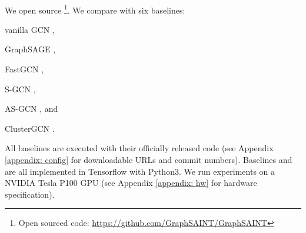\begin{table}[!ht]
\caption{Dataset statistics (``m'' stands for \textbf{m}ulti-class classification, and ``s'' for \textbf{s}ingle-class.)}
    \centering
    \\
    \label{tab: exp-dataset}
\end{table}

We open source {\graphsaint}\footnote{Open sourced code: \url{https://github.com/GraphSAINT/GraphSAINT}}.
We compare with six baselines: 
\begin{enumerate*}
\item vanilla GCN \citep{gcn},
\item GraphSAGE \citep{graphsage},
\item FastGCN \citep{fastgcn},
\item S-GCN \citep{s-gcn},
\item AS-GCN \citep{as-gcn}, and
\item ClusterGCN \citep{cluster-gcn}.
\end{enumerate*}
All baselines are executed with their officially released code (see Appendix \ref{appendix: config} for downloadable URLs and commit numbers).
Baselines and {\graphsaint} are all implemented in Tensorflow with Python3. 
We run experiments on a NVIDIA Tesla P100 GPU (see Appendix \ref{appendix: hw} for hardware specification). 



